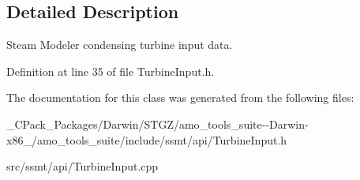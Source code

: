 \subsection{Detailed Description}
Steam Modeler condensing turbine input data. 

Definition at line 35 of file Turbine\+Input.\+h.



The documentation for this class was generated from the following files\+:\begin{DoxyCompactItemize}
\item 
\+\_\+\+C\+Pack\+\_\+\+Packages/\+Darwin/\+S\+T\+G\+Z/amo\+\_\+tools\+\_\+suite-\/-\/\+Darwin-\/x86\+\_/amo\+\_\+tools\+\_\+suite/include/ssmt/api/Turbine\+Input.\+h\item 
src/ssmt/api/Turbine\+Input.\+cpp\end{DoxyCompactItemize}
